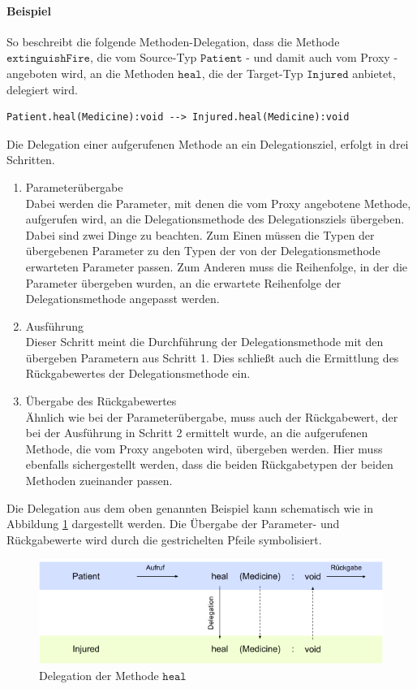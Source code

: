 \documentclass[a4paper,12pt]{article}
\begin{document}
\paragraph{Beispiel} So beschreibt die folgende Methoden-Delegation, dass die Methode $\texttt{extinguishFire}$, die vom Source-Typ $\texttt{Patient}$ - und damit auch vom Proxy - angeboten wird, an die Methoden $\texttt{heal}$, die der Target-Typ $\texttt{Injured}$ anbietet, delegiert wird.
\begin{lstlisting}[style = dsl, caption = Einfache Methoden-Delegation, captionpos = b]
	Patient.heal(Medicine):void --> Injured.heal(Medicine):void
\end{lstlisting}
\noindent
Die Delegation einer aufgerufenen Methode an ein Delegationsziel, erfolgt in drei Schritten.
\begin{enumerate}
\item Parameterübergabe\\
Dabei werden die Parameter, mit denen die vom Proxy angebotene Methode, aufgerufen wird, an die Delegationsmethode des Delegationsziels übergeben. Dabei sind zwei Dinge zu beachten. Zum Einen müssen die Typen der übergebenen Parameter zu den Typen der von der Delegationsmethode erwarteten Parameter passen. Zum Anderen muss die Reihenfolge, in der die Parameter übergeben wurden, an die erwartete Reihenfolge der Delegationsmethode angepasst werden.
\item Ausführung\\
Dieser Schritt meint die Durchführung der Delegationsmethode mit den übergeben Parametern aus Schritt 1. Dies schließt auch die Ermittlung des Rückgabewertes der Delegationsmethode ein.
\item Übergabe des Rückgabewertes\\
Ähnlich wie bei der Parameterübergabe, muss auch der Rückgabewert, der bei der Ausführung in Schritt 2 ermittelt wurde, an die aufgerufenen Methode, die vom Proxy angeboten wird, übergeben werden. Hier muss ebenfalls sichergestellt werden, dass die beiden Rückgabetypen der beiden Methoden zueinander passen.
\end{enumerate}
Die Delegation aus dem oben genannten Beispiel kann schematisch wie in Abbildung \ref{fig:DEL_heal} dargestellt werden. Die Übergabe der Parameter- und Rückgabewerte wird durch die gestrichelten Pfeile symbolisiert.
\begin{figure}[h!]
\includegraphics[width=\linewidth]{MDEL_heal}
\caption{Delegation der Methode $\texttt{heal}$}
\label{fig:DEL_heal}
\end{figure}
\end{document}
